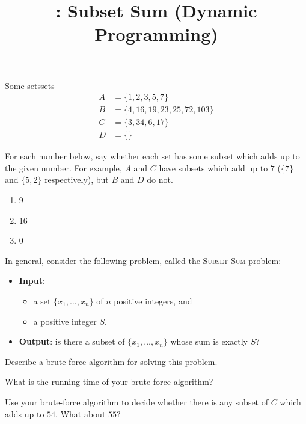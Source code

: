 \documentclass{tufte-handout}
\title{\thecourse: Subset Sum (Dynamic Programming)}
\date{}
\begin{document}
\maketitle

\begin{model*}{Some sets}{sets}
  \begin{align*}
    A &= \{ 1, 2, 3, 5, 7 \} \\
    B &= \{ 4, 16, 19, 23, 25, 72, 103 \} \\
    C &= \{ 3, 34, 6, 17 \} \\
    D &= \{ \}
  \end{align*}
\end{model*}

\begin{questions}
\item For each number below, say whether each set has some subset
  which adds up to the given number.  For example, $A$ and $C$ have
  subsets which add up to $7$ ($\{7\}$ and $\{5,2\}$ respectively),
  but $B$ and $D$ do not.
  \begin{enumerate}[label=(\alph*)]
  \item 9
  \item 16
  \item 0
  \end{enumerate}
\end{questions}

In general, consider the following problem, called the \textsc{Subset Sum}
problem:
\begin{itemize}
\item \textbf{Input}:
  \begin{itemize}
  \item a set $\{x_1, \dots, x_n\}$ of $n$ positive
    integers, and
  \item a positive integer $S$.
  \end{itemize}

\item \textbf{Output}: is there a subset of $\{x_1, \dots, x_n\}$
  whose sum is exactly $S$?
\end{itemize}

\begin{questions}
\item Describe a brute-force algorithm for solving this problem.
\item \label{q:brute} What is the running time of your brute-force
  algorithm?
\item Use your brute-force algorithm to decide whether there is any
  subset of $C$ which adds up to $54$.  What about $55$?
\end{questions}
\end{document}
